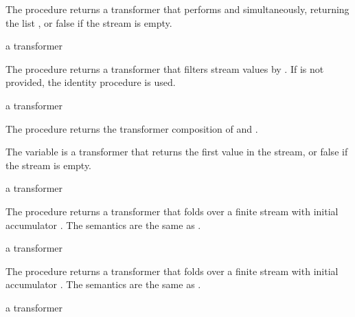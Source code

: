 The  procedure returns a transformer that performs  and
 simultaneously, returning the list , or false
if the stream is empty.

\begin{procedure}
\end{procedure}
\returns{} a transformer

The  procedure returns a transformer that filters stream values by
. If  is not provided, the identity procedure is used.

\begin{procedure}
\end{procedure}
\returns{} a transformer

The  procedure returns the transformer composition of  and .

\begin{variable}
\end{variable}
\antipar

The  variable is a transformer that returns the first value in the stream, or
false if the stream is empty.

\begin{procedure}
\end{procedure}
\returns{} a transformer

The  procedure returns a transformer that folds  over a
finite stream with initial accumulator . The semantics are the same as
.

\begin{procedure}
\end{procedure}
\returns{} a transformer

The  procedure returns a transformer that folds  over a
finite stream with initial accumulator . The semantics are the same as
.

\begin{procedure}
\end{procedure}
\returns{} a transformer

